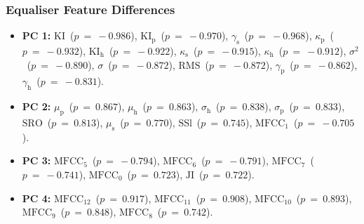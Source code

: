 		\subsubsection*{Equaliser Feature Differences}
			\begin{itemize}
				\item {\bf{PC 1:}} $\textrm{KI}$~($p~=~-0.986$), $\textrm{KI}_{\textrm{p}}$~($p~=~-0.970$),
					$\gamma_{\textrm{s}}$~($p~=~-0.968$), $\kappa_{\textrm{p}}$~($p~=~-0.932$),
					$\textrm{KI}_{\textrm{h}}$~($p~=~-0.922$), $\kappa_{\textrm{s}}$~($p~=~-0.915$),
					$\kappa_{\textrm{h}}$~($p~=~-0.912$), $\sigma^{2}$~($p~=~-0.890$),
					$\sigma$~($p~=~-0.872$), $\textrm{RMS}$~($p~=~-0.872$),
					$\gamma_{\textrm{p}}$~($p~=~-0.862$), $\gamma_{\textrm{h}}$~($p~=~-0.831$).
				\item {\bf{PC 2:}} $\mu_{\textrm{p}}$~($p~=~ 0.867$), $\mu_{\textrm{h}}$~($p~=~ 0.863$),
					$\sigma_{\textrm{h}}$~($p~=~ 0.838$), $\sigma_{\textrm{p}}$~($p~=~ 0.833$),
					$\textrm{SRO}$~($p~=~ 0.813$), $\mu_{\textrm{s}}$~($p~=~ 0.770$),
					$\textrm{SSl}$~($p~=~ 0.745$), $\textrm{MFCC}_{1}$~($p~=~-0.705$).
				\item {\bf{PC 3:}} $\textrm{MFCC}_{5}$~($p~=~-0.794$), $\textrm{MFCC}_{6}$~($p~=~-0.791$),
					$\textrm{MFCC}_{7}$~($p~=~-0.741$), $\textrm{MFCC}_{0}$~($p~=~ 0.723$),
					$\textrm{JI}$~($p~=~ 0.722$).
				\item {\bf{PC 4:}} $\textrm{MFCC}_{12}$~($p~=~0.917$), $\textrm{MFCC}_{11}$~($p~=~0.908$),
					$\textrm{MFCC}_{10}$~($p~=~0.893$), $\textrm{MFCC}_{9}$~($p~=~0.848$),
					$\textrm{MFCC}_{8}$~($p~=~0.742$).
			\end{itemize}

